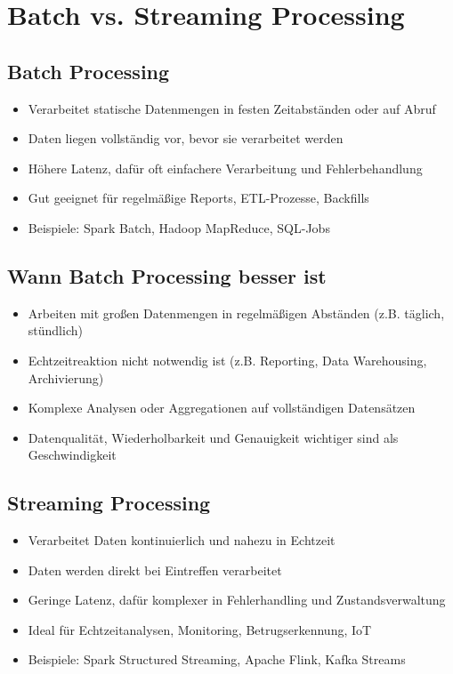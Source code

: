 \documentclass[11pt]{scrartcl}
\begin{document}
\newpage
\section{Batch vs. Streaming Processing}
\subsection{Batch Processing}
\begin{itemize}
	\item Verarbeitet statische Datenmengen in festen Zeitabständen oder auf Abruf
	\item Daten liegen vollständig vor, bevor sie verarbeitet werden
	\item Höhere Latenz, dafür oft einfachere Verarbeitung und Fehlerbehandlung
	\item Gut geeignet für regelmäßige Reports, ETL-Prozesse, Backfills
	\item Beispiele: Spark Batch, Hadoop MapReduce, SQL-Jobs
\end{itemize}

\subsection{Wann Batch Processing besser ist}
\begin{itemize}
	\item Arbeiten mit großen Datenmengen in regelmäßigen Abständen (z.B. täglich, stündlich)
	\item Echtzeitreaktion nicht notwendig ist (z.B. Reporting, Data Warehousing, Archivierung)
	\item Komplexe Analysen oder Aggregationen auf vollständigen Datensätzen 
	\item Datenqualität, Wiederholbarkeit und Genauigkeit wichtiger sind als Geschwindigkeit
\end{itemize}

\subsection{Streaming Processing}
\begin{itemize}
	\item Verarbeitet Daten kontinuierlich und nahezu in Echtzeit
	\item Daten werden direkt bei Eintreffen verarbeitet
	\item Geringe Latenz, dafür komplexer in Fehlerhandling und Zustandsverwaltung
	\item Ideal für Echtzeitanalysen, Monitoring, Betrugserkennung, IoT
	\item Beispiele: Spark Structured Streaming, Apache Flink, Kafka Streams
\end{itemize}
\end{document}

